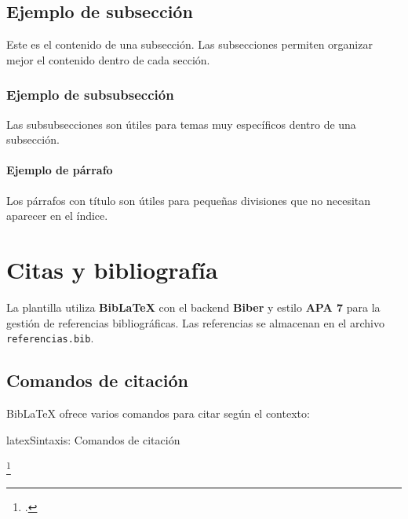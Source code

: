 \subsection{Ejemplo de subsección}

Este es el contenido de una subsección. Las subsecciones permiten organizar mejor el contenido dentro de cada sección.

\subsubsection{Ejemplo de subsubsección}

Las subsubsecciones son útiles para temas muy específicos dentro de una subsección.

\paragraph{Ejemplo de párrafo} Los párrafos con título son útiles para pequeñas divisiones que no necesitan aparecer en el índice.

\section{Citas y bibliografía}
\label{sec:citas}

La plantilla utiliza \textbf{BibLaTeX} con el backend \textbf{Biber} y estilo
\textbf{APA 7} para la gestión de referencias bibliográficas. Las referencias
se almacenan en el archivo \texttt{referencias.bib}.

\subsection{Comandos de citación}
\label{subsec:comandos-citacion}

BibLaTeX ofrece varios comandos para citar según el contexto:

\begin{codigosimple}{latex}{Sintaxis: Comandos de citación}
\textcite{latex2024}

\parencite{latex2024}

\citeauthor{latex2024}

\citeyear{latex2024}

\parencite[p.~25]{latex2024}

\parencite{latex2024,garcia2024,bishop2023}

\footcite{latex2024}
\end{codigosimple}

